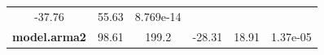 \documentclass[]{article}
\begin{document}
\begin{longtable}[]{@{}cccccc@{}}
\begin{minipage}[t]{0.10\columnwidth}
-37.76\strut
\end{minipage} & \begin{minipage}[t]{0.12\columnwidth}\centering\strut
55.63\strut
\end{minipage} & \begin{minipage}[t]{0.12\columnwidth}\centering\strut
8.769e-14\strut
\end{minipage}\tabularnewline
\begin{minipage}[t]{0.21\columnwidth}\centering\strut
\textbf{model.arma2}\strut
\end{minipage} & \begin{minipage}[t]{0.07\columnwidth}\centering\strut
98.61\strut
\end{minipage} & \begin{minipage}[t]{0.07\columnwidth}\centering\strut
199.2\strut
\end{minipage} & \begin{minipage}[t]{0.10\columnwidth}\centering\strut
-28.31\strut
\end{minipage} & \begin{minipage}[t]{0.12\columnwidth}\centering\strut
18.91\strut
\end{minipage} & \begin{minipage}[t]{0.12\columnwidth}\centering\strut
1.37e-05\strut
\end{minipage}\tabularnewline
\bottomrule
\end{longtable}
\end{document}
